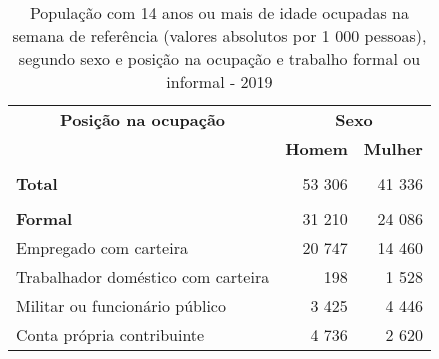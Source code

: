 \documentclass[12pt]{article}   %
\begin{document}
\begin{table}[h!]
    \centering
    \caption{População com 14 anos ou mais de idade ocupadas na semana de referência (valores absolutos por 1 000 pessoas), segundo sexo e posição na ocupação e trabalho formal ou informal - 2019}
    \vspace{-0.3cm}
    \label{tab_sexo_ocupadas}
    \begin{tabular}{lrr}
    \hline
    \multicolumn{1}{c|}{\textbf{Posição na ocupação}}                    & \multicolumn{2}{c}{\textbf{Sexo}}                                                                  \\
    \multicolumn{1}{l|}{}                                                & \multicolumn{1}{c}{\textbf{Homem}}              & \multicolumn{1}{c}{\textbf{Mulher}}              \\ \hline
    \multicolumn{1}{l|}{}                                                &                                                 &                                                  \\
    \multicolumn{1}{l|}{\textbf{Total}}                                  & 53 306                                          & 41 336                                           \\
    \multicolumn{1}{l|}{}                                                &                                                 &                                                  \\
    \multicolumn{1}{l|}{\textbf{Formal}}                                 & 31 210                                          & 24 086                                           \\
    \multicolumn{1}{l|}{Empregado com carteira}                          & 20 747                                          & 14 460                                           \\
    \multicolumn{1}{l|}{Trabalhador doméstico com carteira}              & 198                                             & 1 528                                            \\
    \multicolumn{1}{l|}{Militar ou funcionário público}                  & 3 425                                           & 4 446                                            \\
    \multicolumn{1}{l|}{Conta própria contribuinte}                      & 4 736                                           & 2 620                                            \\

\end{tabular}
\end{table}
\end{document}

